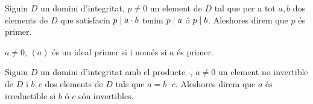 \documentclass[../../Main.tex]{subfiles}
\begin{document}
	\begin{definition}[Primer]
		\label{def:primer en un anell}
		Siguin \(D\) un domini d'integritat, \(p\neq0\) un element de \(D\) tal que per a tot \(a,b\) dos elements de \(D\) que satisfacin \(p\mathrel{|} a\cdot b\) tenim \(p\mathrel{|} a\) ó \(p\mathrel{|} b\). Aleshores direm que \(p\) és primer.
	\end{definition}
	\begin{observation}
		\label{obs:ideals primer iff primer}
		\(a\neq0\), \((a)\) és un ideal primer si i només si \(a\) és primer.
	\end{observation}
	\begin{definition}
		\label{def:irreductible en un anell}
		Siguin \(D\) un domini d'integritat amb el producte \(\cdot\), \(a\neq0\) un element no invertible de \(D\) i \(b,c\) dos elements de \(D\) tals que \(a=b\cdot c\). Aleshores direm que \(a\) és irreductible si \(b\) ó \(c\) són invertibles.
	\end{definition}
\end{document}
